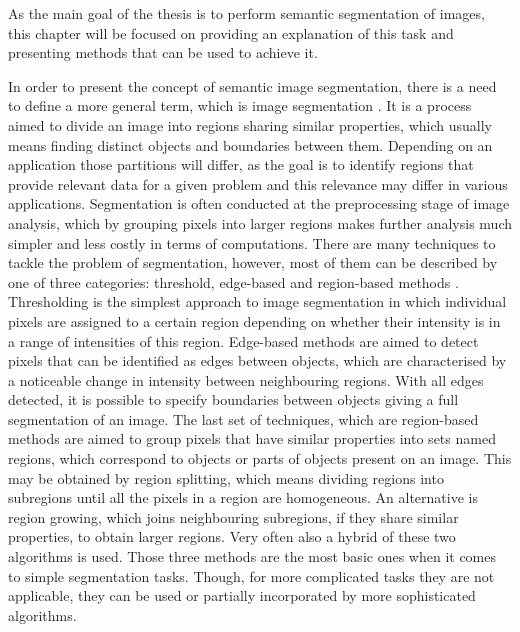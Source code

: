 As the main goal of the thesis is to perform semantic segmentation of images, this chapter will be focused on providing an explanation of this task and presenting methods that can be used to achieve it. 

In order to present the concept of semantic image segmentation, there is a need to define a more general term, which is image segmentation \cite{digital_image_processing}. It is a process aimed to divide an image into regions sharing similar properties, which usually means finding distinct objects and boundaries between them. Depending on an application those partitions will differ, as the goal is to identify regions that provide relevant data for a given problem and this relevance may differ in various applications.  Segmentation is often conducted at the preprocessing stage of image analysis, which by grouping pixels into larger regions makes further analysis much simpler and less costly in terms of computations. 
There are many techniques to tackle the problem of segmentation, however, most of them can be described by one of three categories: threshold, edge-based and region-based methods \cite{Glasbey_segmentation}. Thresholding is the simplest approach to image segmentation in which individual pixels are assigned to a certain region depending on whether their intensity is in a range of intensities of this region. Edge-based methods are aimed to detect pixels that can be identified as edges between objects, which are characterised by a noticeable change in intensity between neighbouring regions. With all edges detected, it is possible to specify boundaries between objects giving a full segmentation of an image. The last set of techniques, which are region-based methods are aimed to group pixels that have similar properties into sets named regions, which correspond to objects or parts of objects present on an image. This may be obtained by region splitting, which means dividing regions into subregions until all the pixels in a region are homogeneous.  An alternative is region growing, which joins neighbouring subregions, if they share similar properties, to obtain larger regions. Very often also a hybrid of these two algorithms is used. 
Those three methods are the most basic ones when it comes to simple segmentation tasks. Though, for more complicated tasks they are not applicable, they can be used or partially incorporated by more sophisticated algorithms. 
